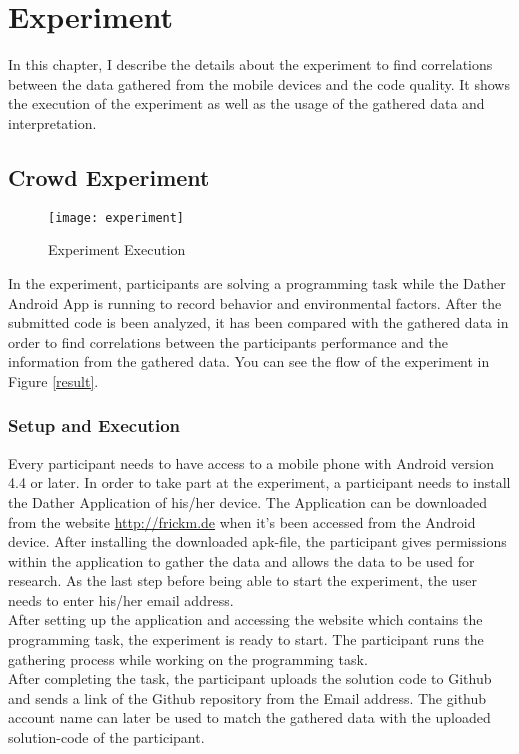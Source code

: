 \chapter{Experiment}
In this chapter, I describe the details about the experiment to find correlations between the data gathered from the mobile devices and the code quality. It shows the execution of the experiment as well as the usage of the gathered data and interpretation. 

\section{Crowd Experiment}

\begin{figure}
\texttt{[image: experiment]}
\caption{Experiment Execution}\label{experiment}
\vspace{10 mm}
\end{figure}

In the experiment, participants are solving a programming task while the Dather Android App is running to record behavior and environmental factors. After the submitted code is been analyzed, it has been compared with the gathered data in order to find correlations between the participants performance and the information from the gathered data. You can see the flow of the experiment in Figure \ref{result}. 
\subsection{Setup and Execution}
Every participant needs to have access to a mobile phone with Android version 4.4 or later. In order to take part at the experiment, a participant needs to install the Dather Application of his/her device. The Application can be downloaded from the website \url{http://frickm.de} when it's been accessed from the Android device. 
\bigbreak
After installing the downloaded apk-file, the participant gives permissions within the application to gather the data and allows the data to be used for research. 
As the last step before being able to start the experiment, the user needs to enter his/her email address.\\
After setting up the application and accessing the website which contains the programming task, the experiment is ready to start. The participant runs the gathering process while working on the programming task.\\
After completing the task, the participant uploads the solution code to Github and sends a link of the Github repository from the Email address. The github account name can later be used to match the gathered data with the uploaded solution-code of the participant. 

